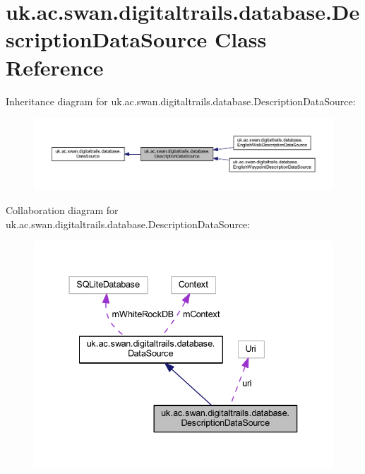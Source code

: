 \hypertarget{classuk_1_1ac_1_1swan_1_1digitaltrails_1_1database_1_1_description_data_source}{\section{uk.\+ac.\+swan.\+digitaltrails.\+database.\+Description\+Data\+Source Class Reference}
\label{classuk_1_1ac_1_1swan_1_1digitaltrails_1_1database_1_1_description_data_source}
}


Inheritance diagram for uk.\+ac.\+swan.\+digitaltrails.\+database.\+Description\+Data\+Source\+:\nopagebreak
\begin{figure}[H]
\begin{center}
\leavevmode
\includegraphics[width=350pt]{classuk_1_1ac_1_1swan_1_1digitaltrails_1_1database_1_1_description_data_source__inherit__graph}
\end{center}
\end{figure}


Collaboration diagram for uk.\+ac.\+swan.\+digitaltrails.\+database.\+Description\+Data\+Source\+:\nopagebreak
\begin{figure}[H]
\begin{center}
\leavevmode
\includegraphics[width=337pt]{classuk_1_1ac_1_1swan_1_1digitaltrails_1_1database_1_1_description_data_source__coll__graph}
\end{center}
\end{figure}
